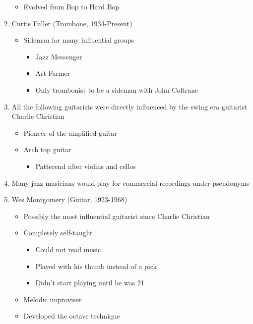 \documentclass[]{article}
\providecommand{\tightlist}{%
  \setlength{\itemsep}{0pt}\setlength{\parskip}{0pt}}
\begin{document}
\begin{enumerate}
  \begin{itemize}
  \tightlist
  \item
    Evolved from Bop to Hard Bop
  \end{itemize}
\item
  Curtis Fuller (Trombone, 1934-Present)

  \begin{itemize}
  \tightlist
  \item
    Sideman for many influential groups

    \begin{itemize}
    \tightlist
    \item
      Jazz Messenger
    \item
      Art Farmer
    \item
      Only trombonist to be a sideman with John Coltrane
    \end{itemize}
  \end{itemize}
\item
  All the following guitarists were directly influenced by the swing era
  guitarist Charlie Christian

  \begin{itemize}
  \tightlist
  \item
    Pioneer of the amplified guitar
  \item
    Arch top guitar

    \begin{itemize}
    \tightlist
    \item
      Patterend after violins and cellos
    \end{itemize}
  \end{itemize}
\item
  Many jazz musicians would play for commercial recordings under
  pseudonyms
\item
  Wes Montgomery (Guitar, 1923-1968)

  \begin{itemize}
  \tightlist
  \item
    Possibly the most influential guitarist since Charlie Christian
  \item
    Completely self-taught

    \begin{itemize}
    \tightlist
    \item
      Could not read music
    \item
      Played with his thumb instead of a pick
    \item
      Didn't start playing until he was 21
    \end{itemize}
  \item
    Melodic improviser
  \item
    Developed the octave technique


\end{itemize}
\end{enumerate}
\end{document}
